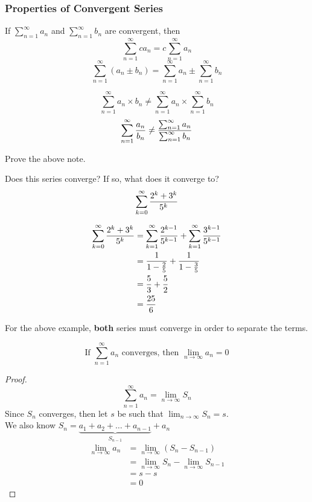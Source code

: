 \documentclass[english, 12pt]{article}
\begin{document}
\subsubsection*{Properties of Convergent Series}
If $\sum_{n=1}^\infty a_{n}$ and $\sum_{n=1}^\infty b_{n}$ are convergent, then 
\[\sum_{n=1}^\infty c a_{n} = c  \sum_{n=1}^\infty a_{n} \]
\[\sum_{n=1}^\infty (a_{n} \pm b_{n}) =  \sum_{n=1}^\infty a_{n} \pm \sum_{n=1}^\infty b_{n}\]
\begin{note}
\[ \sum_{n=1}^\infty a_{n}\times b_{n} \neq \sum_{n=1}^\infty a_{n}\times \sum_{n=1}^\infty b_{n}\]
\[ \sum_{n=1}^\infty \frac{a_{n}}{b_{n}} \neq \frac{\sum_{n=1}^\infty a_{n}}{\sum_{n=1}^\infty b_{n}}\]
\end{note}
\begin{exercise}
Prove the above note.
\end{exercise}
\begin{exmp}
Does this series converge? If so, what does it converge to?
\[\sum_{k=0}^\infty \frac{2^k+3^k}{5^k} \]
\begin{sol}
\begin{align*}
\sum_{k=0}^\infty \frac{2^k+3^k}{5^k} &= \sum_{k=1}^\infty \frac{2^{k-1}}{5^{k-1}} + \sum_{k=1}^\infty \frac{3^{k-1}}{5^{k-1}}\\
&= \frac{1}{1-\frac{2}{5}} + \frac{1}{1-\frac{3}{5}} \\
&= \frac{5}{3} + \frac{5}{2}\\
&= \frac{25}{6}
\end{align*}
\end{sol}
\begin{note}
For the above example, \textbf{both} series must converge in order to separate the terms.
\end{note}
\end{exmp}
\begin{thrm}
\[ \text{If } \sum_{n=1}^\infty a_{n} \text{ converges, then } \lim_{n\to\infty} a_{n} = 0\]

\begin{proof}
\[ \sum_{n=1}^\infty a_{n} = \lim_{n\to\infty} S_{n} \]
Since $S_{n}$ converges, then let $s$ be such that $\lim_{n\to\infty} S_{n} = s$.\\
We also know $S_{n} = \underbrace{a_{1} + a_{2} + \dots + a_{n-1}}_{S_{n-1}} + a_{n}$
\begin{align*}
\lim_{n\to\infty} a_{n} &= \lim_{n\to\infty} (S_{n} - S_{n-1})\\
&=\lim_{n\to\infty} S_{n} - \lim_{n\to\infty} S_{n-1}\\
&= s - s \\
&= 0 
\end{align*}
\end{proof}
\end{thrm}
\end{document}
